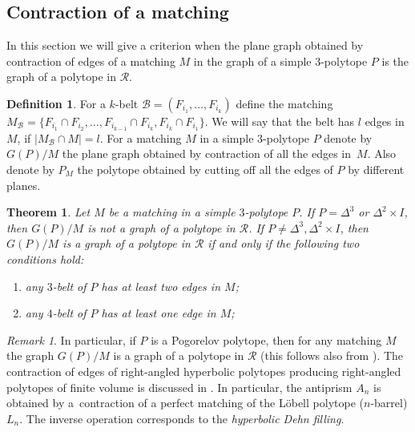 \documentclass[12pt]{amsart}
\newtheorem{theorem}[formula]{Theorem}
\theoremstyle{definition}
\newtheorem{definition}[formula]{Definition}
\theoremstyle{remark}
\newtheorem{remark}[formula]{Remark}
\begin{document}
\subsection{Contraction of a matching}
In this section we will give a criterion when the plane graph obtained by contraction of edges of a matching  $M$
in the graph of a simple $3$-polytope $P$ is the graph of a polytope in $\mathcal{R}$.
\begin{definition}
For a $k$-belt $\mathcal{B}=(F_{i_1},\dots, F_{i_k})$ define the matching 
$M_\mathcal{B}=\{F_{i_1}\cap F_{i_2},\dots, F_{i_{k-1}}\cap F_{i_k}, F_{i_k}\cap F_{i_1}\}$. We will say that the belt has
$l$ edges in $M$, if $|M_\mathcal{B}\cap M|=l$.
For a matching $M$
in a simple $3$-polytope $P$ denote by $G(P)/M$ the plane graph obtained by contraction of all the edges in~$M$.
Also denote by $P_M$ the polytope obtained by cutting off all the edges of $P$ by different planes.
\end{definition}
\begin{theorem}\label{thMH}
Let $M$ be a matching in a simple $3$-polytope $P$. If $P=\Delta^3$ or $\Delta^2\times I$, then $G(P)/M$ 
is not a graph of a polytope in $\mathcal{R}$. If $P\ne \Delta^3, \Delta^2\times I$, then $G(P)/M$ is 
a graph of a polytope in $\mathcal{R}$ if and only if the following two conditions hold:
\begin{enumerate}
\item any $3$-belt of $P$ has at least two edges in $M$;
\item any $4$-belt of $P$ has at least one edge in $M$;
\end{enumerate} 
\end{theorem}
\begin{remark}
In particular, if $P$ is a Pogorelov polytope, then for any matching $M$ the graph
$G(P)/M$ is a graph of a polytope in $\mathcal{R}$ 
(this follows also from  \cite[Theorems 6.5 and 11.6]{E19}). The contraction of edges of right-angled hyperbolic polytopes producing right-angled polytopes of finite volume is discussed in \cite{BD25}. In particular, the antiprism $A_n$ is obtained by a~contraction of a perfect matching of the L\"obell polytope ($n$-barrel) $L_n$. The inverse operation corresponds to the {\it hyperbolic Dehn filling}.
\end{remark}
\end{document}
